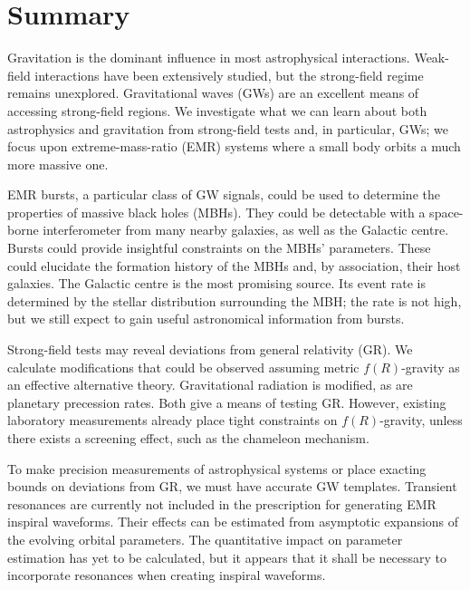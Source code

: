\chapter{Summary}
\label{summary}

Gravitation is the dominant influence in most astrophysical interactions. Weak-field interactions have been extensively studied, but the strong-field regime remains unexplored. Gravitational waves (GWs) are an excellent means of accessing strong-field regions. We investigate what we can learn about both astrophysics and gravitation from strong-field tests and, in particular, GWs; we focus upon extreme-mass-ratio (EMR) systems where a small body orbits a much more massive one.

EMR bursts, a particular class of GW signals, could be used to determine the properties of massive black holes (MBHs). They could be detectable with a space-borne interferometer from many nearby galaxies, as well as the Galactic centre. Bursts could provide insightful constraints on the MBHs' parameters. These could elucidate the formation history of the MBHs and, by association, their host galaxies. The Galactic centre is the most promising source. Its event rate is determined by the stellar distribution surrounding the MBH; the rate is not high, but we still expect to gain useful astronomical information from bursts.

Strong-field tests may reveal deviations from general relativity (GR). We calculate modifications that could be observed assuming metric $f(R)$-gravity as an effective alternative theory. Gravitational radiation is modified, as are planetary precession rates. Both give a means of testing GR. However, existing laboratory measurements already place tight constraints on $f(R)$-gravity, unless there exists a screening effect, such as the chameleon mechanism.

To make precision measurements of astrophysical systems or place exacting bounds on deviations from GR, we must have accurate GW templates. Transient resonances are currently not included in the prescription for generating EMR inspiral waveforms. Their effects can be estimated from asymptotic expansions of the evolving orbital parameters. The quantitative impact on parameter estimation has yet to be calculated, but it appears that it shall be necessary to incorporate resonances when creating inspiral waveforms.
